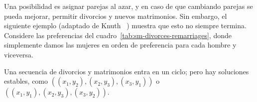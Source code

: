  Una posibilidad es asignar parejas al azar,
  y en caso de que cambiando parejas se pueda mejorar,
  permitir divorcios y nuevos matrimonios.
  Sin embargo,
  el siguiente ejemplo
  (adaptado de Knuth~%
     \cite{knuth96:_stable_marriage})
  muestra que esto no siempre termina.
  Considere las preferencias del cuadro~\ref{tab:sm-divorces-remarriages},
  donde simplemente damos las mujeres en orden de preferencia para cada hombre
  y viceversa.
  \begin{table}[ht]
    \centering
    \hspace*{3em}
    \caption{Contraejemplo para divorcios y matrimonios}
    \label{tab:sm-divorces-remarriages}
  \end{table}
  Una secuencia de divorcios y matrimonios entra en un ciclo;
  pero hay soluciones estables,
  como \(((x_1, y_2), (x_2, y_3), (x_3, y_1))\)
  o \(((x_1, y_1), (x_2, y_3), (x_3, y_2))\).

